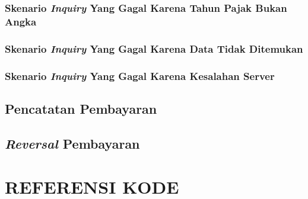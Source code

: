 \documentclass[pdftex,12pt, oneside]{article}
\begin{document}
\subsubsection{Skenario \textit{Inquiry} Yang Gagal Karena Tahun Pajak Bukan Angka}

\subsubsection{Skenario \textit{Inquiry} Yang Gagal Karena Data Tidak Ditemukan}

\subsubsection{Skenario \textit{Inquiry} Yang Gagal Karena Kesalahan Server}

\subsection{Pencatatan Pembayaran}

\subsection{\textit{Reversal} Pembayaran}

\section{REFERENSI KODE}
\end{document}
